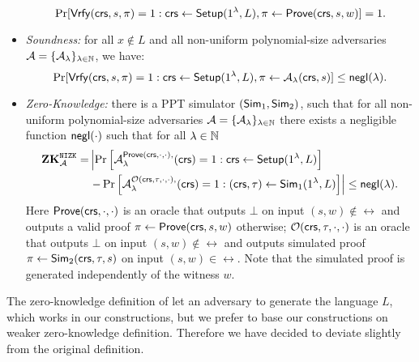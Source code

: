 \begin{definition}
\begin{itemize}
\[\Pr[\mathsf{Vrfy}(\mathsf{crs}, s,\pi)=1:\mathsf{crs} \leftarrow \mathsf{Setup}(1{^{\lambda}}, L), \pi \leftarrow \mathsf{Prove}(\mathsf{crs}, s,w)] =1.\] 
\item \emph{Soundness:} for all $x \notin L$ and all non-uniform polynomial-size adversaries $\mathcal{A} = \{\mathcal{A}_{\lambda}\}_{\lambda \in \mathbb{N}}$, we have:
\[\Pr[\mathsf{Vrfy}(\mathsf{crs}, s,\pi)=1:\mathsf{crs} \leftarrow \mathsf{Setup}(1{^{\lambda}}, L), \pi \leftarrow \mathcal{A}_{\lambda}(\mathsf{crs}, s)] \leq \mathsf{negl}(\lambda).\] 
\item \emph{Zero-Knowledge:} there is a PPT simulator $(\mathsf{Sim}_1, \mathsf{Sim}_2)$, such that for all non-uniform polynomial-size adversaries $\mathcal{A} = \{\mathcal{A}_{\lambda}\}_{\lambda \in \mathbb{N}}$ there exists a negligible function $\mathsf{negl}(\cdot)$ such that for all $\lambda \in \mathbb{N}$ 
\begin{align*}
\mathbf{ZK}_{\mathcal{A}}^{\mathtt{NIZK}} =& 
\left| \Pr\left[ \mathcal{A}_{\lambda}^{\mathsf{Prove}(\mathsf{crs}, \cdot, \cdot),}(\mathsf{crs}) = 1:\mathsf{crs} \leftarrow \mathsf{Setup}(1{^{\lambda}}, L) \right] \right. \\
&\left. - \Pr\left[ \mathcal{A}_{\lambda}^{\mathcal{O}(\mathsf{crs}, \tau, \cdot, \cdot),}(\mathsf{crs}) = 1: (\mathsf{crs}, \tau) \leftarrow \mathsf{Sim}_1(1{^{\lambda}}, L) \right] \right|
\leq \mathsf{negl}(\lambda).
\end{align*}
Here $\mathsf{Prove}(\mathsf{crs}, \cdot, \cdot)$ is an oracle that outputs $\bot$ on input $(s,w) \notin \rel$ and outputs a valid proof $\pi \leftarrow \mathsf{Prove}(\mathsf{crs}, s, w)$ otherwise; $\mathcal{O}(\mathsf{crs}, \tau, \cdot, \cdot)$ is an oracle that outputs $\bot$ on input $(s,w) \notin \rel$ and outputs simulated proof $\pi \leftarrow \mathsf{Sim}_2(\mathsf{crs}, \tau, s)$ on input $(s,w) \in \rel$. Note that the simulated proof is generated independently of the witness $w$.
\end{itemize}

\end{definition}

\begin{remark} 
The zero-knowledge definition of \cite{Libert2021OneShotFN} let an adversary to generate the language $L$, which works in our constructions, but we prefer to base our constructions on weaker zero-knowledge definition. Therefore we have decided to deviate slightly from the original definition. 
\end{remark}

